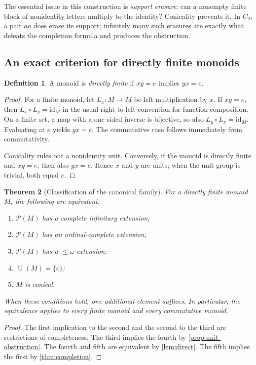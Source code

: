 \documentclass[11pt,letterpaper]{article}
\numberwithin{equation}{section}
\newtheorem{theorem}{Theorem}[section]
\newtheorem{lemma}[theorem]{Lemma}
\theoremstyle{definition}
\newtheorem{definition}[theorem]{Definition}
\theoremstyle{remark}
\newcommand{\PP}{\mathcal{P}}
\newcommand{\units}{\operatorname{U}}
\newcommand{\set}[1]{\{#1\}}
\begin{document}
The essential issue in this construction is \emph{support erasure}: can a nonempty finite block of nonidentity letters multiply to the identity? Conicality prevents it. In $C_2$, a pair $aa$ does erase its support; infinitely many such erasures are exactly what defeats the completion formula and produces the obstruction.

\subsection{An exact criterion for directly finite monoids}
\begin{definition}
A monoid is \emph{directly finite} if $xy=e$ implies $yx=e$.
\end{definition}

\begin{proof}
For a finite monoid, let $L_x:M\to M$ be left multiplication by $x$. If $xy=e$, then $L_x\circ L_y=\mathrm{id}_M$ in the usual right-to-left convention for function composition. On a finite set, a map with a one-sided inverse is bijective, so also $L_y\circ L_x=\mathrm{id}_M$. Evaluating at $e$ yields $yx=e$. The commutative case follows immediately from commutativity.

Conicality rules out a nonidentity unit. Conversely, if the monoid is directly finite and $xy=e$, then also $yx=e$. Hence $x$ and $y$ are units; when the unit group is trivial, both equal $e$.
\end{proof}

\begin{theorem}[Classification of the canonical family]\label{thm:classification}
For a directly finite monoid $M$, the following are equivalent:
\begin{enumerate}[label=(\roman*),itemsep=1pt,topsep=3pt]
\item $\PP(M)$ has a complete infinitary extension;
\item $\PP(M)$ has an ordinal-complete extension;
\item $\PP(M)$ has a $\leq\omega$-extension;
\item $\units(M)=\set{e}$;
\item $M$ is conical.
\end{enumerate}
When these conditions hold, one additional element suffices. In particular, the equivalence applies to every finite monoid and every commutative monoid.
\end{theorem}
\begin{proof}
The first implication to the second and the second to the third are restrictions of completeness. The third implies the fourth by \cref{prop:unit-obstruction}. The fourth and fifth are equivalent by \cref{lem:direct}. The fifth implies the first by \cref{thm:completion}.
\end{proof}
\end{document}
